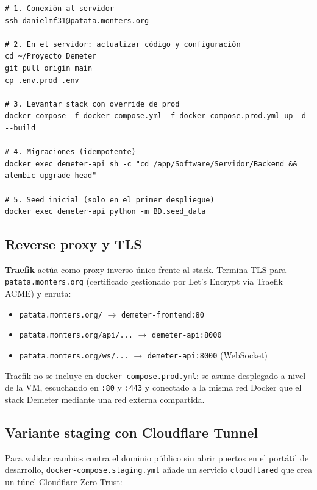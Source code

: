 \begin{lstlisting}[style=trama, caption={Procedimiento de despliegue en producción}]
# 1. Conexión al servidor
ssh danielmf31@patata.monters.org

# 2. En el servidor: actualizar código y configuración
cd ~/Proyecto_Demeter
git pull origin main
cp .env.prod .env

# 3. Levantar stack con override de prod
docker compose -f docker-compose.yml -f docker-compose.prod.yml up -d --build

# 4. Migraciones (idempotente)
docker exec demeter-api sh -c "cd /app/Software/Servidor/Backend && alembic upgrade head"

# 5. Seed inicial (solo en el primer despliegue)
docker exec demeter-api python -m BD.seed_data
\end{lstlisting}

\subsection{Reverse proxy y TLS}

\textbf{Traefik} actúa como proxy inverso único frente al stack. Termina TLS para
\texttt{patata.monters.org} (certificado gestionado por Let's Encrypt vía Traefik
ACME) y enruta:

\begin{itemize}[leftmargin=*, label=--]
    \item \texttt{patata.monters.org/} $\rightarrow$ \texttt{demeter-frontend:80}
    \item \texttt{patata.monters.org/api/...} $\rightarrow$ \texttt{demeter-api:8000}
    \item \texttt{patata.monters.org/ws/...} $\rightarrow$ \texttt{demeter-api:8000} (WebSocket)
\end{itemize}

Traefik no se incluye en \texttt{docker-compose.prod.yml}: se asume desplegado a
nivel de la VM, escuchando en \texttt{:80} y \texttt{:443} y conectado a la misma red
Docker que el stack Demeter mediante una red externa compartida.

\subsection{Variante staging con Cloudflare Tunnel}

Para validar cambios contra el dominio público sin abrir puertos en el portátil de
desarrollo, \texttt{docker-compose.staging.yml} añade un servicio
\texttt{cloudflared} que crea un túnel Cloudflare Zero Trust:

